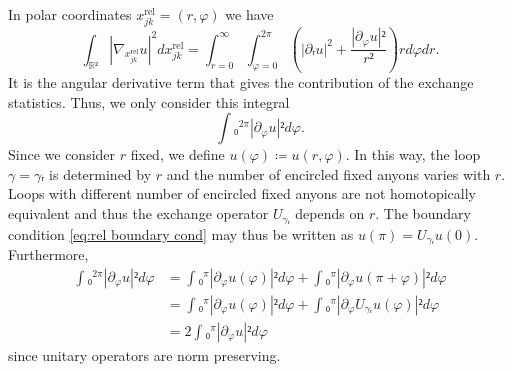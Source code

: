 In polar coordinates $x_{jk}^\text{rel} = (r, φ)$ we have
\begin{equation}
  ∫_{ℝ²} \left|∇_{x_{jk}^\text{rel}} u \right|^2 dx_{jk}^\text{rel} =
  ∫_{r=0}^∞ ∫_{φ=0}^{2π} \left( \left|∂ᵣu\right|^2 + \frac{\left|∂_φu\right|²}{r²} \right) r dφ dr.
\end{equation}
It is the angular derivative term that gives the contribution of the exchange statistics. Thus, we only consider this integral
\begin{equation}
  ∫₀^{2π} \left|∂_φu\right|² dφ.
\end{equation}
Since we consider $r$ fixed, we define $u(φ) ≔ u(r,φ)$. In this way, the loop $γ = γᵣ$ is determined by $r$ and the number of encircled fixed anyons varies with $r$. Loops with different number of encircled fixed anyons are not homotopically equivalent and thus the exchange operator $U_{γᵣ}$ depends on $r$. The boundary condition \cref{eq:rel boundary cond} may thus be written as $u(π) = U_{γᵣ} u(0)$. Furthermore,
\begin{equation}
  \begin{aligned}
    ∫₀^{2π} \left|∂_φu\right|² dφ
    &=
    ∫₀^π \left|∂_φu(φ)\right|² dφ +
    ∫₀^π \left|∂_φu(π+φ)\right|² dφ \\
    &=
    ∫₀^π \left|∂_φu(φ)\right|² dφ +
    ∫₀^π \left|∂_φU_{γᵣ}u(φ)\right|² dφ \\
    &=
    2∫₀^π \left|∂_φu\right|² dφ
  \end{aligned}
\end{equation}
since unitary operators are norm preserving.


